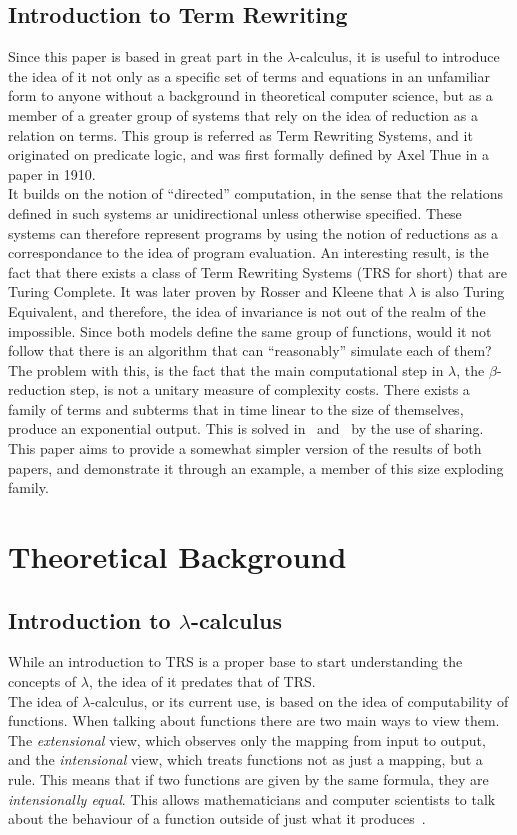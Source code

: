 \documentclass[12pt]{article}
\begin{document}
\subsection{Introduction to Term Rewriting}
Since this paper is based in great part in the $\lambda$-calculus, it is useful to introduce the idea of it not only as a specific set of terms and equations in an unfamiliar form to anyone without a background in theoretical computer science, but as a member of a greater group of systems that rely on the idea of reduction as a relation on terms. This group is referred as Term Rewriting Systems, and it originated on predicate logic, and was first formally defined by Axel Thue in a paper in 1910.\\
It builds on the notion of \enquote{directed} computation, in the sense that the relations defined in such systems ar unidirectional unless otherwise specified. These systems can therefore represent programs by using the notion of reductions as a correspondance to the idea of program evaluation. An interesting result, is the fact that there exists a class of Term Rewriting Systems (TRS for short) that are Turing Complete. It was later proven by Rosser and Kleene that $\lambda$ is also Turing Equivalent, and therefore, the idea of invariance is not out of the realm of the impossible. Since both models define the same group of functions, would it not follow that there is an algorithm that can \enquote{reasonably} simulate each of them? \\
The problem with this, is the fact that the main computational step in $\lambda$, the $\beta$-reduction step, is not a unitary measure of complexity costs. There exists a family of terms and subterms that in time linear to the size of themselves, produce an exponential output. This is solved in~\cite{invariance-of-cost-model} and~\cite{beta-invariance} by the use of sharing. This paper aims to provide a somewhat simpler version of the results of both papers, and demonstrate it through an example, a member of this size exploding family.

\section{Theoretical Background}\label{theoretical-background}
  \subsection{Introduction to $\lambda$-calculus}\label{intro-lambda}
  While an introduction to TRS is a proper base to start understanding the concepts of $\lambda$, the idea of it predates that of TRS. \\
The idea of $\lambda$-calculus, or its current use, is based on the idea of computability of functions. When talking about functions there are two main ways to view them. The \textit{extensional} view, which observes only the mapping from input to output, and the \textit{intensional} view, which treats functions not as just a mapping, but a rule. This means that if two functions are given by the same formula, they are \textit{intensionally equal}. This allows mathematicians and computer scientists to talk about the behaviour of a function outside of just what it produces~\cite{selinger}.
\end{document}
